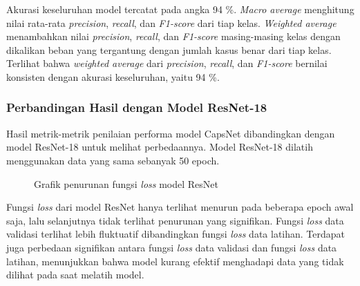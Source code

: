 \documentclass{article}
\begin{document}
   			\par Akurasi keseluruhan model tercatat pada angka 94 \%. \textit{Macro average} menghitung nilai rata-rata \textit{precision}, \textit{recall}, dan \textit{F1-score} dari tiap kelas. \textit{Weighted average} menambahkan nilai \textit{precision}, \textit{recall}, dan \textit{F1-score} masing-masing kelas dengan dikalikan beban yang tergantung dengan jumlah kasus benar dari tiap kelas. Terlihat bahwa \textit{weighted average} dari \textit{precision}, \textit{recall}, dan \textit{F1-score} bernilai konsisten dengan akurasi keseluruhan, yaitu 94 \%.
   		
   		\subsubsection{Perbandingan Hasil dengan Model ResNet-18}
   		Hasil metrik-metrik penilaian performa model CapsNet dibandingkan dengan model ResNet-18 untuk melihat perbedaannya. Model ResNet-18 dilatih menggunakan data yang sama sebanyak 50 epoch.
   		
   		\begin{figure}[H]
   			\caption{Grafik penurunan fungsi \textit{loss} model ResNet}
   			\label{loss_resnet}
   		\end{figure}
   		\par Fungsi \textit{loss} dari model ResNet hanya terlihat menurun pada beberapa epoch awal saja, lalu selanjutnya tidak terlihat penurunan yang signifikan. Fungsi \textit{loss} data validasi terlihat lebih fluktuatif dibandingkan fungsi \textit{loss} data latihan. Terdapat juga perbedaan signifikan antara fungsi \textit{loss} data validasi dan fungsi \textit{loss} data latihan, menunjukkan bahwa model kurang efektif menghadapi data yang tidak dilihat pada saat melatih model.
   		
\end{document}
